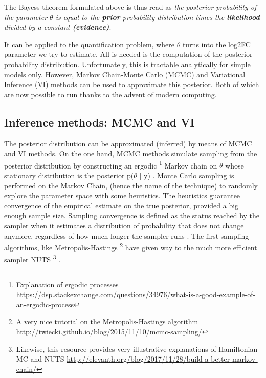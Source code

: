 The Bayes\textquotesingle s theorem formulated above is thus read as \textit{the posterior probability of the parameter $\theta$ is equal to the \textbf{prior} probability distribution times the \textbf{likelihood} divided by a constant \textbf{(evidence)}}.

It can be applied to the quantification problem, where $\theta$ turns into the \ac{log2FC} parameter we try to estimate. All is needed is the computation of the posterior probability distribution. Unfortunately, this is tractable analytically for simple models only. However, Markov Chain-Monte Carlo (\ac{MCMC}) and Variational Inference (\ac{VI}) methods can be used to approximate this posterior. Both of which are now possible to run thanks to the advent of modern computing.

\subsection{Inference methods: \ac{MCMC} and \ac{VI}}

The posterior distribution can be approximated (inferred) by means of \ac{MCMC} and \ac{VI} methods. On the one hand, \ac{MCMC} methods simulate sampling from the posterior distribution by constructing an ergodic \footnote{Explanation of ergodic processes \href{https://dsp.stackexchange.com/questions/34976/what-is-a-good-example-of-an-ergodic-process}{https://dsp.stackexchange.com/questions/34976/what-is-a-good-example-of-an-ergodic-process}} Markov chain on $\theta$ whose stationary distribution is the posterior p($\theta$ | y) \cite{Blei2017}. Monte Carlo sampling is performed on the Markov Chain, (hence the name of the technique) to randomly explore the parameter space with some heuristics. The heuristics guarantee convergence of the empirical estimate on the true posterior, provided a big enough sample size. Sampling convergence is defined as the status reached by the sampler when it estimates a distribution of probability that does not change anymore, regardless of how much longer the sampler runs \cite{Tran2018}. The first sampling algorithms, like Metropolis-Hastings \footnote{A very nice tutorial on the Metropolis-Hastings algorithm \href{http://twiecki.github.io/blog/2015/11/10/mcmc-sampling/}{http://twiecki.github.io/blog/2015/11/10/mcmc-sampling/}} \cite{Chib1995} have given way to the much more efficient sampler \ac{NUTS} \footnote{Likewise, this resource provides very illustrative explanations of Hamiltonian-MC and NUTS \href{http://elevanth.org/blog/2017/11/28/build-a-better-markov-chain/}{http://elevanth.org/blog/2017/11/28/build-a-better-markov-chain/}} \cite{Hoffman2011}.

